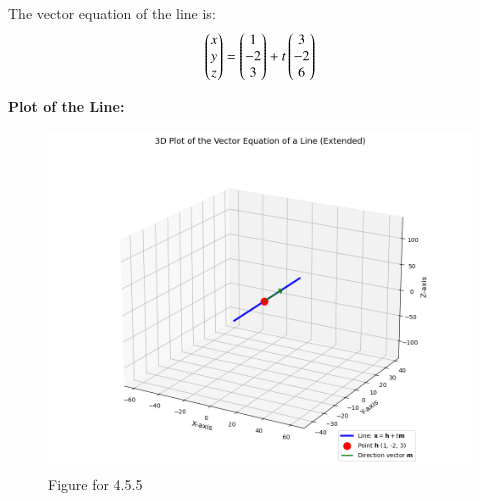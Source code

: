 \documentclass[journal]{IEEEtran}
\begin{document}
\bigskip

The vector equation of the line is:
$$ \begin{pmatrix}x \\ y \\ z\end{pmatrix} = \begin{pmatrix}1 \\ -2 \\ 3\end{pmatrix} + t \begin{pmatrix}3 \\ -2 \\ 6\end{pmatrix} $$



\textbf{Plot of the Line:}
\begin{figure}[h!]
    \centering
    \includegraphics[width=1.0\columnwidth]{figs/fig1.png}
    \caption{Figure for 4.5.5}
    \label{}
\end{figure}
\end{document}

